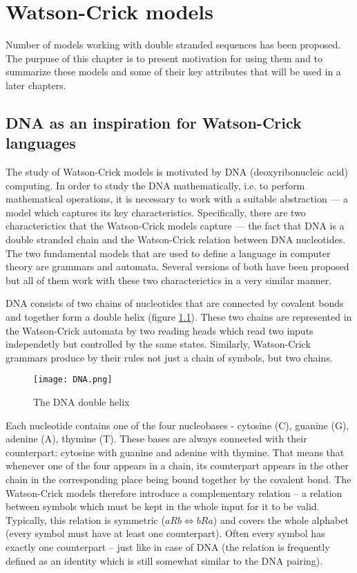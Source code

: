 \chapter{Watson-Crick models} \label{chapter:models}
Number of models working with double stranded sequences has been proposed. The purpuse of this chapter is to present motivation for using them and to summarize these models and some of their key attributes that will be used in a later chapters.

\section{DNA as an inspiration for Watson-Crick languages}
The study of Watson-Crick models is motivated by DNA (deoxyribonucleic acid) computing. In order to study the DNA mathematically, i.e. to perform mathematical operations, it is necessary to work with a suitable abstraction --- a model which captures its key characteristics. Specifically, there are two characterictics that the Watson-Crick models capture --- the fact that DNA is a double stranded chain and the Watson-Crick relation between DNA nucleotides.
The two fundamental models that are used to define a language in computer theory are grammars and automata. Several versions of both have been proposed but all of them work with these two characterictics in a very similar manner.

DNA consists of two chains of nucleotides that are connected by covalent bonds and together form a double helix (figure \ref{fig:dna}). These two chains are represented in the Watson-Crick automata by two reading heads which read two inputs independetly but controlled by the same states. Similarly, Watson-Crick grammars produce by their rules not just a chain of symbols, but two chains.

\begin{figure}[ht]
  \texttt{[image: DNA.png]}
  \centering
  \label{fig:dna}
  \caption{The DNA double helix}
\end{figure}

Each nucleotide contains one of the four nucleobases - cytosine (C), guanine (G), adenine (A), thymine (T). These bases are always connected with their counterpart: cytosine with guanine and adenine with thymine. That means that whenever one of the four appears in a chain, its counterpart appears in the other chain in the corresponding place being bound together by the covalent bond. The Watson-Crick models therefore introduce a complementary relation -- a relation between symbols which must be kept in the whole input for it to be valid. Typically, this relation is symmetric ($a R b \Leftrightarrow b R a$) and covers the whole alphabet (every symbol must have at least one counterpart). Often every symbol has exactly one counterpart -- just like in case of DNA (the relation is frequently defined as an identity which is still somewhat similar to the DNA pairing).


